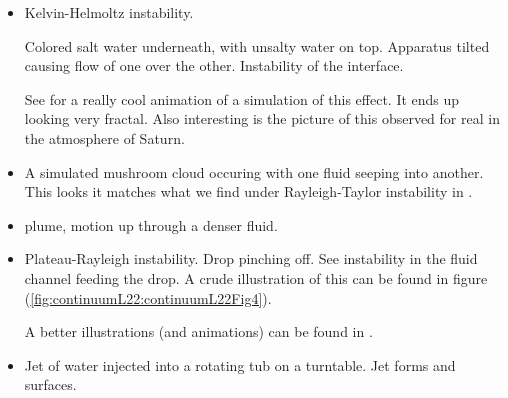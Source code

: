 \begin{itemize}
\item Kelvin-Helmoltz instability.

Colored salt water underneath, with unsalty water on top.  Apparatus tilted causing flow of one over the other.  Instability of the interface.

See \cite{wiki:KelvinHelmholtz} for a really cool animation of a simulation of this effect.  It ends up looking very fractal.  Also interesting is the picture of this observed for real in the atmosphere of Saturn.

\item A simulated mushroom cloud occuring with one fluid seeping into another.  This looks it matches what we find under Rayleigh-Taylor instability in \cite{wiki:RayleighTaylor}.

\item plume, motion up through a denser fluid.

\item Plateau-Rayleigh instability.  Drop pinching off.  See instability in the fluid channel feeding the drop.  A crude illustration of this can be found in figure (\ref{fig:continuumL22:continuumL22Fig4}).


A better illustrations (and animations) can be found in \cite{wiki:PlateauRayleigh}.

\item Jet of water injected into a rotating tub on a turntable.  Jet forms and surfaces.

\end{itemize}

\EndArticle
